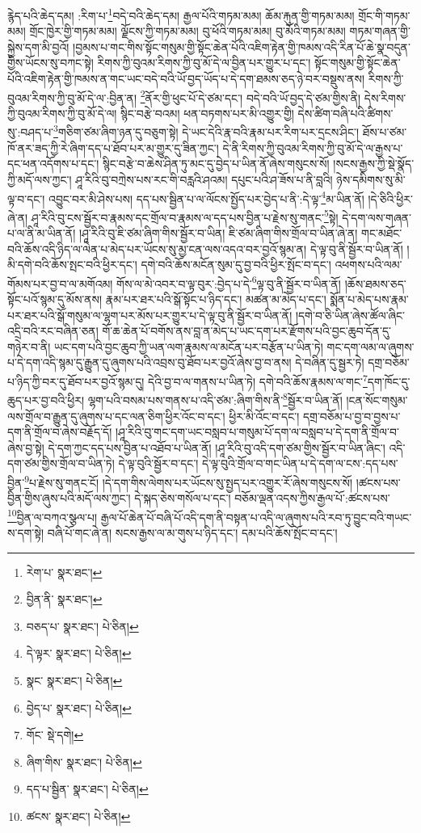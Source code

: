 རྙེད་པའི་ཆེད་དམ། :རིག་པ་\footnote{རེག་པ་  སྣར་ཐང་། }བདེ་བའི་ཆེད་དམ། རྒྱལ་པོའི་གཏམ་མམ། ཆོམ་རྐུན་གྱི་གཏམ་མམ། གྲོང་གི་གཏམ་མམ། གྲོང་ཁྱེར་གྱི་གཏམ་མམ། ལྗོངས་ཀྱི་གཏམ་མམ། བུ་ཕོའི་གཏམ་མམ། བུ་མོའི་གཏམ་མམ། གཏམ་གཞན་གྱི་སྐྱེས་དག་མི་བྱའོ། །བྱམས་པ་གང་གིས་སྟོང་གསུམ་གྱི་སྟོང་ཆེན་པོའི་འཇིག་རྟེན་གྱི་ཁམས་འདི་རིན་པོ་ཆེ་སྣ་བདུན་གྱིས་ཡོངས་སུ་བཀང་སྟེ། རིགས་ཀྱི་བུའམ་རིགས་ཀྱི་བུ་མོ་དེ་ལ་བྱིན་པར་གྱུར་པ་དང་། སྟོང་གསུམ་གྱི་སྟོང་ཆེན་པོའི་འཇིག་རྟེན་གྱི་ཁམས་ན་གང་ཡང་བདེ་བའི་ཡོ་བྱད་ཡོད་པ་དེ་དག་ཐམས་ཅད་ཉེ་བར་བསྡུས་ནས། རིགས་ཀྱི་བུའམ་རིགས་ཀྱི་བུ་མོ་དེ་ལ་:བྱིན་ན། \footnote{བྱིན་ནི་  སྣར་ཐང་། }ནོར་གྱི་ཕུང་པོ་དེ་ཙམ་དང་། བདེ་བའི་ཡོ་བྱད་དེ་ཙམ་གྱིས་ནི། དེས་རིགས་ཀྱི་བུའམ་རིགས་ཀྱི་བུ་མོ་དེ་ལ། སྙིང་བརྩེ་བའམ། ཕན་བཏགས་པར་མི་འགྱུར་གྱི། དེས་ཚིག་བཞི་པའི་ཚིགས་སུ་:བཤད་པ་\footnote{བཅད་པ་  སྣར་ཐང་།  པེ་ཅིན། }གཅིག་ཙམ་ཞིག་ཉན་དུ་བཅུག་སྟེ། དེ་ཡང་དེའི་རྣ་བའི་རྣམ་པར་རིག་པར་དྲངས་ཤིང་། ཐོས་པ་ཙམ་ཁོ་ནར་ཟད་ཀྱི་རེ་ཞིག་དད་པ་ཐོབ་པར་མ་གྱུར་དུ་ཟིན་ཀྱང་། དེ་ནི་རིགས་ཀྱི་བུའམ་རིགས་ཀྱི་བུ་མོ་དེ་ལ་རྒྱས་པ་དང་ཕན་འདོགས་པ་དང་། སྙིང་བརྩེ་བ་ཆེས་ཤིན་ཏུ་མང་དུ་བྱེད་པ་ཡིན་ནོ་ཞེས་གསུངས་སོ། །སངས་རྒྱས་ཀྱི་སྡེ་སྣོད་ཀྱི་མདོ་ལས་ཀྱང་། ཤཱ་རིའི་བུ་བཀྲེས་པས་རང་གི་བརླའི་ཤའམ། དཔུང་པའི་ཤ་ཟོས་པ་ནི་བླའི། ཉེས་དམིགས་སུ་མི་ལྟ་བ་དང་། འབྱུང་བར་མི་ཤེས་པས། དད་པས་སྦྱིན་པ་ལ་ལོངས་སྤྱོད་པར་བྱེད་པ་ནི་:དེ་ལྟ་\footnote{དེ་ལྟར་  སྣར་ཐང་།  པེ་ཅིན། }མ་ཡིན་ནོ། །དེ་ཅིའི་ཕྱིར་ཞེ་ན། ཤཱ་རིའི་བུ་ངས་སྦྱོར་བ་རྣམས་དང་གྲོལ་བ་རྣམས་ལ་དད་པས་བྱིན་པ་རྗེས་སུ་གནང་\footnote{སྣང་  སྣར་ཐང་།  པེ་ཅིན། }སྟེ། དེ་དག་ལས་གཞན་པ་ལ་ནི་མ་ཡིན་ནོ། །ཤཱ་རིའི་བུ་ཇི་ཙམ་ཞིག་གིས་སྦྱོར་བ་ཡིན། ཇི་ཙམ་ཞིག་གིས་གྲོལ་བ་ཡིན་ཞེ་ན། གང་མཐོང་བའི་ཆོས་འདི་ཉིད་ལ་ལེན་པ་མེད་པར་ཡོངས་སུ་མྱ་ངན་ལས་འདའ་བར་བྱའོ་སྙམ་ན། དེ་ལྟ་བུ་ནི་སྦྱོར་བ་ཡིན་ནོ། །མི་དགེ་བའི་ཆོས་སྤང་བའི་ཕྱིར་དང་། དགེ་བའི་ཆོས་མངོན་སུམ་དུ་བྱ་བའི་ཕྱིར་སྤོང་བ་དང་། འཕགས་པའི་ལམ་གོམས་པར་བྱ་བ་ལ་མགོའམ། གོས་ལ་མེ་འབར་བ་ལྟ་བུར་:བྱེད་པ་དེ་\footnote{བྱེད་པ་  སྣར་ཐང་།  པེ་ཅིན། }ལྟ་བུ་ནི་སྦྱོར་བ་ཡིན་ནོ། །ཆོས་ཐམས་ཅད་སྟོང་པའོ་སྙམ་དུ་མོས་ནས། རྣམ་པར་ཐར་པའི་སྒོ་སྟོང་པ་ཉིད་དང་། མཚན་མ་མེད་པ་དང་། སྨོན་པ་མེད་པས་རྣམ་པར་ཐར་པའི་སྒོ་གསུམ་ལ་ལྷག་པར་མོས་པར་གྱུར་པ་དེ་ལྟ་བུ་ནི་སྦྱོར་བ་ཡིན་ནོ། །དགེ་བ་ཅི་ཡིན་ཞེས་ཚོལ་ཞིང་འདྲི་བའི་རང་བཞིན་ཅན། གོ་ཆ་ཆེན་པོ་བགོས་ནས་བླ་ན་མེད་པ་ཡང་དག་པར་རྫོགས་པའི་བྱང་ཆུབ་དོན་དུ་གཉེར་བ་ནི། ཡང་དག་པའི་བྱང་ཆུབ་ཀྱི་ཡན་ལག་རྣམས་ལ་མངོན་པར་བརྩོན་པ་ཡིན་ཏེ། གང་དག་ལམ་ལ་ཞུགས་པ་དེ་དག་འདི་སྙམ་དུ་རྒྱུན་དུ་ཞུགས་པའི་འབྲས་བུ་ཐོབ་པར་བྱའོ་ཞེས་བྱ་བ་ནས། དེ་བཞིན་དུ་སྦྱར་ཏེ། དགྲ་བཅོམ་པ་ཉིད་ཀྱི་བར་དུ་ཐོབ་པར་བྱའོ་སྙམ་དུ། དེའི་བྱ་བ་ལ་གནས་པ་ཡིན་ཏེ། དགེ་བའི་ཆོས་རྣམས་ལ་གང་\footnote{གོང་  སྡེ་དགེ། }དག་ཁོང་དུ་ཆུད་པར་བྱ་བའི་ཕྱིར། ལྷག་པའི་བསམ་པས་གནས་པ་འདི་ཙམ་:ཞིག་གིས་ནི་\footnote{ཞིག་གིས་  སྣར་ཐང་།  པེ་ཅིན། }སྦྱོར་བ་ཡིན་ནོ། །ངན་སོང་གསུམ་ལས་གྲོལ་བ་རྒྱུན་དུ་ཞུགས་པ་དང་ལན་ཅིག་ཕྱིར་འོང་བ་དང་། ཕྱིར་མི་འོང་བ་དང་། དགྲ་བཅོམ་པ་བྱ་བ་བྱས་པ་དག་ནི་གྲོལ་བ་ཞེས་བརྗོད་དོ། །ཤཱ་རིའི་བུ་གང་དག་ཡང་བསླབ་པ་གསུམ་པོ་དག་ལ་བསླབ་པ་དེ་དག་ནི་གྲོལ་བ་ཞེས་བྱ་སྟེ། དེ་དག་ཀྱང་དད་པས་བྱིན་པ་འཐོབ་པ་ཡིན་ནོ། །ཤཱ་རིའི་བུ་འདི་དག་ཙམ་གྱིས་སྦྱོར་བ་ཡིན་ཞིང་། འདི་དག་ཙམ་གྱིས་གྲོལ་བ་ཡིན་ཏེ། དེ་ལྟ་བུའི་སྦྱོར་བ་དང་། དེ་ལྟ་བུའི་གྲོལ་བ་གང་ཡིན་པ་དེ་དག་ལ་ངས་:དད་པས་བྱིན་\footnote{དད་པ་སྦྱིན་  སྣར་ཐང་།  པེ་ཅིན། }པ་རྗེས་སུ་གནང་ངོ། །དེ་དག་གིས་ལེགས་པར་ཡོངས་སུ་སྤྱད་པར་འགྱུར་རོ་ཞེས་གསུངས་སོ། །ཚངས་པས་བྱིན་གྱིས་ཞུས་པའི་མདོ་ལས་ཀྱང་། དེ་སྐད་ཅེས་གསོལ་པ་དང་། བཅོམ་ལྡན་འདས་ཀྱིས་རྒྱལ་པོ་:ཚངས་པས་\footnote{ཚངས་  སྣར་ཐང་།  པེ་ཅིན། }བྱིན་ལ་བཀའ་སྩལ་པ། རྒྱལ་པོ་ཆེན་པོ་བཞི་པོ་འདི་དག་ནི་བསྟན་པ་འདི་ལ་ཞུགས་པའི་རབ་ཏུ་བྱུང་བའི་གཡང་ས་དག་སྟེ། བཞི་པོ་གང་ཞེ་ན། སངས་རྒྱས་ལ་མ་གུས་པ་ཉིད་དང་། དམ་པའི་ཆོས་སྤོང་བ་དང་། 